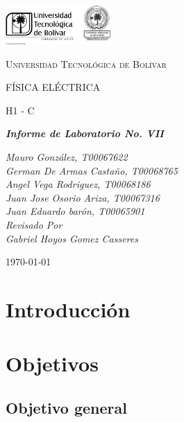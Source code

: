 \documentclass[twocolumn, 12pt]{article}
\begin{document}
\begin{titlepage}
    \centering
    \includegraphics[width=0.3\textwidth]{Images/logo_utb.png}\par\vspace{1cm}
    {\scshape\LARGE Universidad Tecnológica de Bolívar \par}
    \vspace{1cm}

    {\scshape\Large FÍSICA ELÉCTRICA \par}
    \vspace{.2cm}

    {\scshape\Large H1 - C \par}
    \vspace{1cm}
    \slshape {\Large \bfseries{}Informe de Laboratorio No. VII\\}
    \vspace{1cm}

    \slshape {\itshape{} Mauro González, T00067622 \\}
    \slshape {\itshape{} German De Armas Castaño, T00068765 \\}
    \slshape {\itshape{} Angel Vega Rodriguez, T00068186 \\}
    \slshape {\itshape{} Juan Jose Osorio Ariza, T00067316 \\}
    \slshape {\itshape{} Juan Eduardo barón, T00065901 \\}
    \vfill
    Revisado Por \\
    Gabriel Hoyos Gomez Casseres\\
    {\large \today\par}
\end{titlepage}

\section{Introducción}

\section{Objetivos}

\subsection{Objetivo general}
\end{document}
